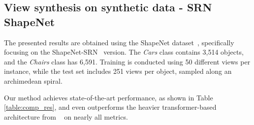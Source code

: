 \subsection{View synthesis on synthetic data - SRN ShapeNet}
The presented results are obtained using the ShapeNet dataset~\citep{chang2015shapenet}, specifically focusing on the ShapeNet-SRN~\citep{sitzmann2019scene} version. The \textit{Cars} class contains 3,514 objects, and the \textit{Chairs} class has 6,591. Training is conducted using 50 different views per instance, while the test set includes 251 views per object, sampled along an archimedean spiral.\newline

Our method achieves state-of-the-art performance, as shown in Table \ref{table:comp_res}, and even outperforms the heavier transformer-based architecture from ~\citep{lin2023vision} on nearly all metrics.

